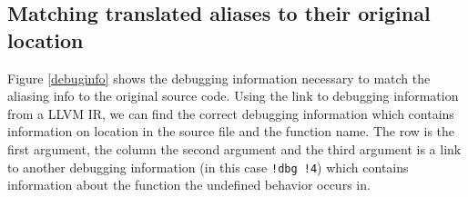 \subsection{Matching translated aliases to their original location}
Figure \ref{debuginfo} shows the debugging information necessary to match the aliasing info to the original source code. Using the link to debugging information from a LLVM IR, we can find the correct debugging information which contains information on location in the source file and the function name. The row is the first argument, the column the second argument and the third argument is a link to another debugging information (in this case \verb|!dbg !4|) which contains information about the function the undefined behavior occurs in.

